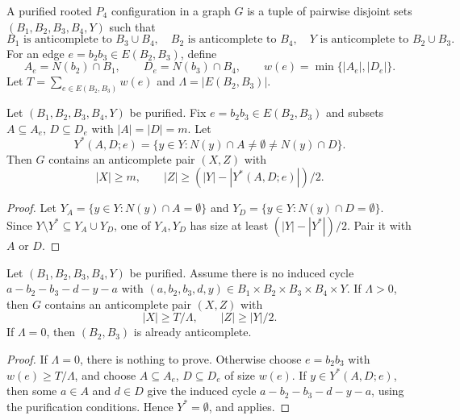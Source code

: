 \begin{definition}\label{def:purified}
A purified rooted $P_4$ configuration in a graph $G$ is a tuple of pairwise disjoint sets $(B_1,B_2,B_3,B_4,Y)$ such that
\[
  B_1\text{ is anticomplete to }B_3\cup B_4,
  \quad B_2\text{ is anticomplete to }B_4,
  \quad Y\text{ is anticomplete to }B_2\cup B_3.
\]
For an edge $e=b_2b_3\in E(B_2,B_3)$, define
\[
  A_e=N(b_2)\cap B_1,
  \qquad D_e=N(b_3)\cap B_4,
  \qquad w(e)=\min\{|A_e|,|D_e|\}.
\]
Let $T=\sum_{e\in E(B_2,B_3)}w(e)$ and $\Lambda=|E(B_2,B_3)|$.
\end{definition}

\begin{proposition}\label{prop:defect-extraction}
Let $(B_1,B_2,B_3,B_4,Y)$ be purified. Fix $e=b_2b_3\in E(B_2,B_3)$ and subsets $A\subseteq A_e$, $D\subseteq D_e$ with $|A|=|D|=m$. Let
\[
  Y^*(A,D;e)=\{y\in Y:N(y)\cap A\ne\emptyset\ne N(y)\cap D\}.
\]
Then $G$ contains an anticomplete pair $(X,Z)$ with
\[
  |X|\ge m,
  \qquad |Z|\ge (|Y|-|Y^*(A,D;e)|)/2.
\]
\end{proposition}

\begin{proof}
Let $Y_A=\{y\in Y:N(y)\cap A=\emptyset\}$ and $Y_D=\{y\in Y:N(y)\cap D=\emptyset\}$. Since $Y\setminus Y^*\subseteq Y_A\cup Y_D$, one of $Y_A,Y_D$ has size at least $(|Y|-|Y^*|)/2$. Pair it with $A$ or $D$.
\end{proof}

\begin{theorem}\label{thm:two-anchor-extraction}
Let $(B_1,B_2,B_3,B_4,Y)$ be purified. Assume there is no induced cycle $a-b_2-b_3-d-y-a$ with $(a,b_2,b_3,d,y)\in B_1\times B_2\times B_3\times B_4\times Y$. If $\Lambda>0$, then $G$ contains an anticomplete pair $(X,Z)$ with
\[
  |X|\ge T/\Lambda,
  \qquad |Z|\ge |Y|/2.
\]
If $\Lambda=0$, then $(B_2,B_3)$ is already anticomplete.
\end{theorem}

\begin{proof}
If $\Lambda=0$, there is nothing to prove. Otherwise choose $e=b_2b_3$ with $w(e)\ge T/\Lambda$, and choose $A\subseteq A_e$, $D\subseteq D_e$ of size $w(e)$. If $y\in Y^*(A,D;e)$, then some $a\in A$ and $d\in D$ give the induced cycle $a-b_2-b_3-d-y-a$, using the purification conditions. Hence $Y^*=\emptyset$, and  applies.
\end{proof}

